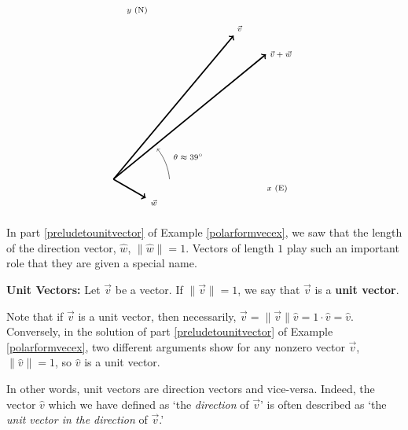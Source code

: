 \documentclass{ximera}
\begin{document}
\begin{example}
\begin{explanation}
\[\begin{array}{cc}
\begin{tikzpicture}[scale=0.6]
\node[anchor=west] at (8,-0.5) {\scriptsize $x$ (E)};
\node[anchor=west] at (0.5,9) {\scriptsize $y$ (N)};

\draw[->] (3,0) arc[start angle=5,end angle=39,radius=3];
\node at (4,1.2) {\scriptsize $\theta\approx39^\circ$};

\draw[->,line width=1.25pt] (0,0)--(6.43,7.66);
\node at (6.75,8.04) {\scriptsize $\vec v$};

\draw[->,line width=1.25pt] (0,0)--(1.73,-1);
\node at (2.16,-1.25) {\scriptsize $\vec w$};

\draw[->,line width=1.25pt] (0,0)--(8.16,6.66);
\node[right] at (8.16,6.66) {\scriptsize $\vec v+\vec w$};

\end{tikzpicture}
\end{array}
\]
\end{explanation} 
\end{example}

In part \ref{preludetounitvector} of Example \ref{polarformvecex}, we saw that the length of the direction vector, $\hat{w}$,  $\| \hat{w} \| = 1$.  Vectors of length $1$  play such an important role that they are given a special name.

 

\begin{definition} \label{unitvectordefn}   \textbf{Unit Vectors:}   Let $\overrightarrow{v}$ be a vector. If $\| \overrightarrow{v} \| = 1$, we say that $\overrightarrow{v}$ is a \textbf{unit vector}.

\end{definition}
 

Note that if $\overrightarrow{v}$ is a unit vector, then necessarily,  $\overrightarrow{v} = \| \overrightarrow{v} \| \hat{v} = 1 \cdot \hat{v} = \hat{v}$.  Conversely,  in the solution of part \ref{preludetounitvector} of Example \ref{polarformvecex}, two different arguments show for any nonzero vector $\overrightarrow{v}$, $\| \hat{v} \| = 1$, so $\hat{v}$ is a unit vector.  

 

In other words, unit vectors are direction vectors and vice-versa. Indeed, the vector $\hat{v}$ which we have defined as `the \textit{direction} of $\overrightarrow{v}$' is often described as `the \textit{unit vector in the direction} of $\overrightarrow{v}$.'
\end{document}
